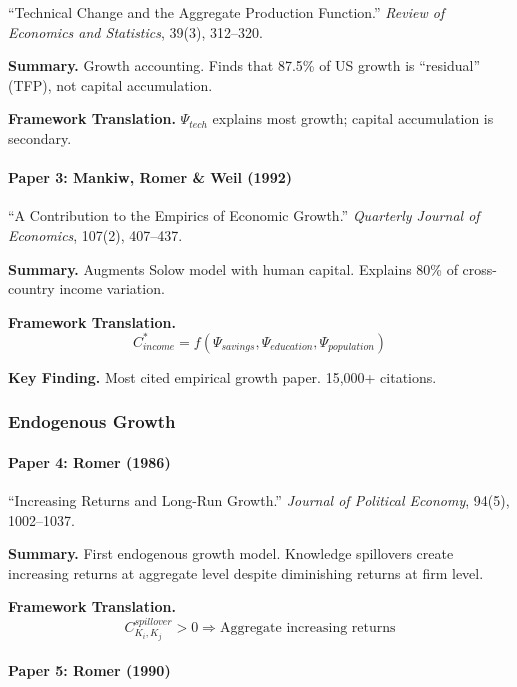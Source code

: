 ``Technical Change and the Aggregate Production Function.''
\textit{Review of Economics and Statistics}, 39(3), 312--320.

\textbf{Summary.}
Growth accounting. Finds that 87.5\% of US growth is ``residual'' (TFP), 
not capital accumulation.

\textbf{Framework Translation.}
$\Psi_{tech}$ explains most growth; capital accumulation is secondary.

\paragraph{Paper 3: Mankiw, Romer \& Weil (1992)}

``A Contribution to the Empirics of Economic Growth.''
\textit{Quarterly Journal of Economics}, 107(2), 407--437.

\textbf{Summary.}
Augments Solow model with human capital. Explains 80\% of cross-country 
income variation.

\textbf{Framework Translation.}
\begin{equation}
C^*_{income} = f(\Psi_{savings}, \Psi_{education}, \Psi_{population})
\end{equation}

\textbf{Key Finding.}
Most cited empirical growth paper. 15,000+ citations.

\subsubsection{Endogenous Growth}

\paragraph{Paper 4: Romer (1986)}

``Increasing Returns and Long-Run Growth.''
\textit{Journal of Political Economy}, 94(5), 1002--1037.

\textbf{Summary.}
First endogenous growth model. Knowledge spillovers create increasing returns 
at aggregate level despite diminishing returns at firm level.

\textbf{Framework Translation.}
\begin{equation}
C_{K_i, K_j}^{spillover} > 0 \Rightarrow \text{Aggregate increasing returns}
\end{equation}

\paragraph{Paper 5: Romer (1990)}

